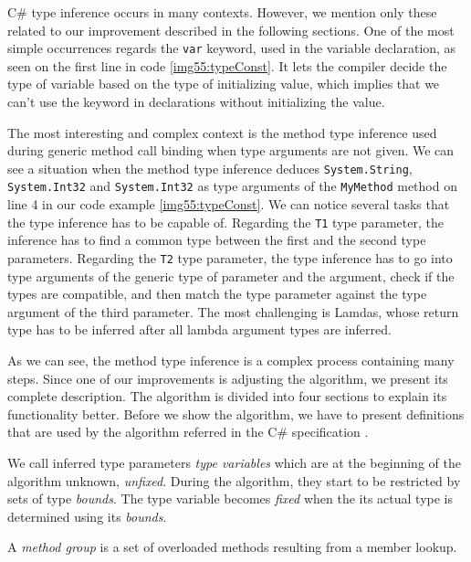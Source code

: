 C\# type inference occurs in many contexts. 
However, we mention only these related to our improvement described in the following sections. 
One of the most simple occurrences regards the \texttt{var} keyword, used in the variable declaration, as seen on the first line in code \ref{img55:typeConst}. It lets the compiler decide the type of variable based on the type of initializing value, which implies that we can’t use the keyword in declarations without initializing the value.
\par
The most interesting and complex context is the method type inference used during generic method call binding when type arguments are not given. 
We can see a situation when the method type inference deduces \texttt{System.String}, \texttt{System.Int32} and \texttt{System.Int32} as type arguments of the \texttt{MyMethod} method on line 4 in our code example \ref{img55:typeConst}. 
We can notice several tasks that the type inference has to be capable of.
Regarding the \texttt{T1} type parameter, the inference has to find a common type between the first and the second type parameters. 
Regarding the \texttt{T2} type parameter, the type inference has to go into type arguments of the generic type of parameter and the argument, check if the types are compatible, and then match the type parameter against the type argument of the third parameter. 
The most challenging is Lamdas, whose return type has to be inferred after all lambda argument types are inferred.
\par
As we can see, the method type inference is a complex process containing many steps.
Since one of our improvements is adjusting the algorithm, we present its complete description.
The algorithm is divided into four sections to explain its functionality better.
Before we show the algorithm, we have to present definitions that are used by the algorithm referred in the C\# specification \cite{online:csTypeInference}.
\par
\begin{defn}
We call inferred type parameters \emph{type variables} which are at the beginning of the algorithm unknown, \emph{unfixed}. 
During the algorithm, they start to be restricted by sets of type \emph{bounds}.
The type variable becomes \emph{fixed} when the its actual type is determined using its \emph{bounds}.
\end{defn}
\begin{defn}
A \emph{method group} is a set of overloaded methods resulting from a member lookup.
\end{defn}
